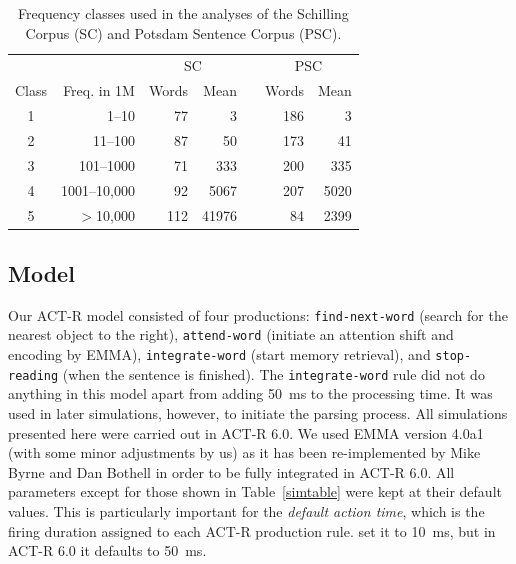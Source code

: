 \begin{table}[!htbp]
\centering
\begin{tabular}{crrrrrr} 
\hline
  &  & \multicolumn{2}{c}{SC} & & \multicolumn{2}{c}{PSC} \\ \cline{3-4} \cline{6-7}
  Class & Freq. in 1M & Words & Mean & & Words & Mean   \\ 
\hline
  1     & 1--10   & 77  & 3     & & 186 & 3         \\
  2     &  11--100 & 87  & 50    & & 173 & 41        \\
  3     &  101--1000 & 71  & 333   & & 200 & 335       \\
  4     &  1001--10,000 & 92  & 5067  & & 207 & 5020      \\
  5     &  $>$10,000  & 112 & 41976 & & 84  & 2399      \\ 
\hline
\end{tabular}
\caption{Frequency classes used in the analyses of the Schilling Corpus (SC) and Potsdam Sentence Corpus (PSC).}
\label{classtable}
\end{table}

\subsection{Model}
Our ACT-R model consisted of four productions:  \texttt{find-next-word} (search for the nearest object to the right),  \texttt{attend-word} (initiate an attention shift and encoding by EMMA),  \texttt{integrate-word} (start memory retrieval), and  \texttt{stop-reading} (when the sentence is finished).  The \texttt{integrate-word} rule did not do anything in this model apart from adding 50~ms to the processing time. It was used in later simulations, however, to initiate the parsing process.
All simulations presented here were carried out in ACT-R 6.0. We used EMMA version 4.0a1 (with some minor adjustments by us) as it has been re-implemented by Mike Byrne and Dan Bothell in order to be fully integrated in ACT-R 6.0.  All parameters except for those shown in Table~\ref{simtable} were kept at their default values.  This is particularly important for the \emph{default action time}, which is the firing duration assigned to each ACT-R production rule. \cite{Salvucci2001} set it to 10~ms, but in ACT-R 6.0 it defaults to 50~ms.

